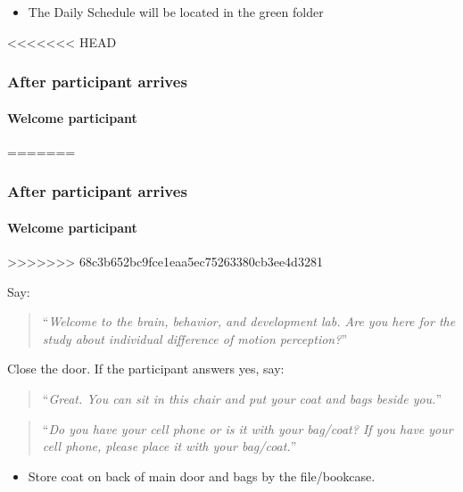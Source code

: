 \documentclass[]{article}
\providecommand{\tightlist}{%
  \setlength{\itemsep}{0pt}\setlength{\parskip}{0pt}}
\let\oldparagraph\paragraph
\renewcommand{\paragraph}[1]{\oldparagraph{#1}\mbox{}}
\begin{document}
\begin{itemize}
\tightlist
\item
  The Daily Schedule will be located in the green folder
\end{itemize}

<<<<<<< HEAD
\subsubsection{After participant
arrives}\label{after-participant-arrives}

\paragraph{Welcome participant}\label{welcome-participant}
=======
\hypertarget{after-participant-arrives}{%
\subsubsection{After participant
arrives}\label{after-participant-arrives}}

\hypertarget{welcome-participant}{%
\paragraph{Welcome participant}\label{welcome-participant}}
>>>>>>> 68c3b652bc9fce1eaa5ec75263380cb3ee4d3281

Say:

\begin{quote}
``\emph{Welcome to the brain, behavior, and development lab. Are you
here for the study about individual difference of motion perception?}''
\end{quote}

Close the door. If the participant answers yes, say:

\begin{quote}
``\emph{Great. You can sit in this chair and put your coat and bags
beside you.}''
\end{quote}

\begin{quote}
``\emph{Do you have your cell phone or is it with your bag/coat? If you
have your cell phone, please place it with your bag/coat.}''
\end{quote}

\begin{itemize}
\tightlist
\item
  Store coat on back of main door and bags by the file/bookcase.
\end{itemize}
\end{document}
